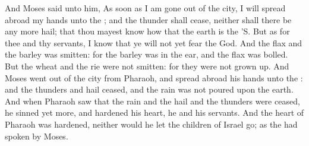 \begin{biblechapter}
\verse And Moses said unto him, As soon as I am gone out of the city, I will spread abroad my hands unto the \LORD; and the thunder shall cease, neither shall there be any more hail; that thou mayest know how that the earth is the \LORD'S.
\verse But as for thee and thy servants, I know that ye will not yet fear the \LORD God.
\verse And the flax and the barley was smitten: for the barley was in the ear, and the flax was bolled.
\verse But the wheat and the rie were not smitten: for they were not grown up.
\verse And Moses went out of the city from Pharaoh, and spread abroad his hands unto the \LORD: and the thunders and hail ceased, and the rain was not poured upon the earth.
\verse And when Pharaoh saw that the rain and the hail and the thunders were ceased, he sinned yet more, and hardened his heart, he and his servants.
\verse And the heart of Pharaoh was hardened, neither would he let the children of Israel go; as the \LORD had spoken by Moses.
\end{biblechapter}

